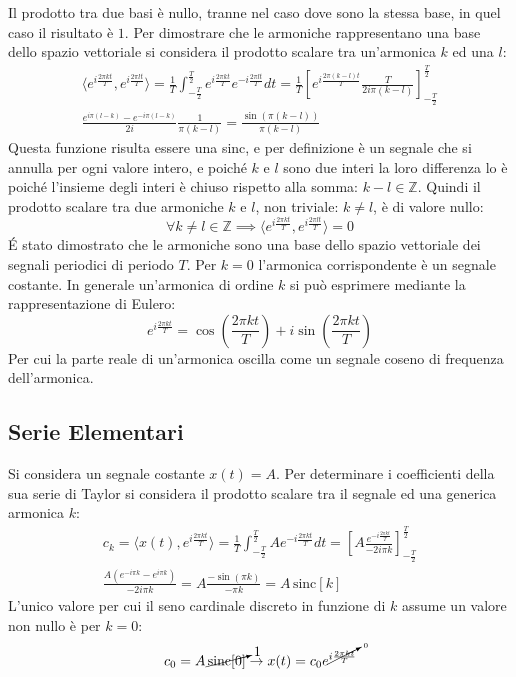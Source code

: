\documentclass{article}
\numberwithin{equation}{subsection}
\begin{document}
Il prodotto tra due basi è nullo, tranne nel caso dove sono la stessa base, in quel caso il risultato è $1$. Per dimostrare che le armoniche rappresentano una base dello 
spazio vettoriale si considera il prodotto scalare tra un'armonica $k$ ed una $l$:
\begin{gather*}
    \langle e^{i\frac{2\pi kt}{T}},e^{i\frac{2\pi lt}{T}}\rangle=\displaystyle\frac{1}{T}\int_{-\frac{T}{2}}^{\frac{T}{2}}e^{i\frac{2\pi kt}{T}}e^{-i\frac{2\pi lt}{T}}dt=
    \frac{1}{T}\left[e^{i\frac{2\pi(k-l)t}{T}}\frac{T}{2i\pi (k-l)}\right]^{\frac{T}{2}}_{-\frac{T}{2}}\\
    \displaystyle\frac{e^{i\pi(l-k)}-e^{-i\pi(l-k)}}{2i}\frac{1}{\pi (k-l)}=\frac{\sin(\pi(k-l))}{\pi (k-l)}
\end{gather*} 
Questa funzione risulta essere una sinc, e per definizione è un segnale che si annulla per ogni valore intero, e poiché $k$ e $l$ sono due interi la loro differenza lo è 
poiché l'insieme degli interi è chiuso rispetto alla somma: $k-l\in\mathbb{Z}$. Quindi il prodotto scalare tra due armoniche $k$ e $l$, non triviale: $k\neq l$, è di valore 
nullo:
\begin{equation*}
    \forall k\neq l\in\mathbb{Z}\implies \langle e^{i\frac{2\pi kt}{T}},e^{i\frac{2\pi lt}{T}}\rangle=0
\end{equation*}
\'{E} stato dimostrato che le armoniche sono una base dello spazio vettoriale dei segnali periodici di periodo $T$. 
Per $k=0$ l'armonica corrispondente è un segnale costante. In generale un'armonica di ordine $k$ si può esprimere mediante la rappresentazione di Eulero:
\begin{equation*}
    \displaystyle e^{i\frac{2\pi kt}{T}}=\cos\left(\frac{2\pi kt}{T}\right)+i\sin\left(\frac{2\pi kt}{T}\right)
\end{equation*}
Per cui la parte reale di un'armonica oscilla come un segnale coseno di frequenza dell'armonica. 

\subsection{Serie Elementari}

Si considera un segnale costante $x(t)=A$. Per determinare i coefficienti della sua serie di Taylor si considera il prodotto scalare tra il segnale ed una generica armonica $k$: 
\begin{gather*}
    c_k=\langle x(t),e^{i\frac{2\pi kt}{T}}\rangle=\displaystyle\frac{1}{T}\int_{-\frac{T}{2}}^{\frac{T}{2}}Ae^{-i\frac{2\pi kt}{T}}dt=\left[A\frac{e^{-i\frac{2\pi kt}{T}}}{-2i\pi k}\right]_{-\frac{T}{2}}^{\frac{T}{2}}\\
    \displaystyle\frac{A(e^{-i\pi k}-e^{i\pi k})}{-2i\pi k}=A\frac{-\sin(\pi k)}{-\pi k}=A\,\mbox{sinc}[k]
\end{gather*}
L'unico valore per cui il seno cardinale discreto in funzione di $k$ assume un valore non nullo è per $k=0$:
\begin{equation*}
    c_0=A\,\cancelto{1}{\mbox{sinc}[0]}\to x(t)=c_0e^{\cancelto{0}{i\frac{2\pi kt}{T}}}
\end{equation*}
\end{document}
